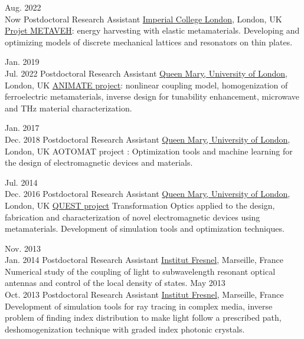 \documentclass{cv}
\begin{document}
\begin{entrylist}


	\entry
	{Aug. 2022 \\Now}
	{Postdoctoral Research Assistant}
	{\href{http://imperial.ac.uk/}{Imperial College London}, London, UK}
	{\href{https://www.metaveh.com/}{Projet METAVEH}: energy harvesting with elastic metamaterials. Developing and optimizing models of discrete mechanical lattices and resonators on thin plates.
	}


	\entry
	{Jan. 2019 \\Jul. 2022}
	{Postdoctoral Research Assistant}
	{\href{http://antennas.eecs.qmul.ac.uk/}{Queen Mary, University of London}, London, UK}
	{\href{https://animate-research.com/}{ANIMATE project}: nonlinear coupling model, homogenization of ferroelectric metamaterials, inverse design for tunability enhancement, microwave and THz material characterization.
	}


	\entry
	{Jan. 2017 \\Dec. 2018}
	{Postdoctoral Research Assistant}
	{\href{http://antennas.eecs.qmul.ac.uk/}{Queen Mary, University of London}, London, UK}
	{AOTOMAT project : Optimization tools and machine learning for the design of electromagnetic
		devices and materials.
	}

	\entry
	{Jul. 2014 \\Dec. 2016}
	{Postdoctoral Research Assistant}
	{\href{http://antennas.eecs.qmul.ac.uk/}{Queen Mary, University of London}, London, UK}
	{\href{http://www.quest-spatial-transformation.org/}{QUEST project}
		Transformation Optics applied to the design, fabrication and characterization of novel electromagnetic devices using metamaterials.
		Development of simulation tools and optimization techniques.
	}


	\entry
	{Nov. 2013\\ Jan. 2014}
	{Postdoctoral Research Assistant}
	{\href{http://www.fresnel.fr/}{Institut Fresnel}, Marseille, France}
	{
		Numerical study of the coupling of light
		to subwavelength resonant optical antennas and control of the local density of states.
	}
	\entry
	{May 2013 \\Oct. 2013}
	{Postdoctoral Research Assistant}
	{\href{http://www.fresnel.fr/}{Institut Fresnel}, Marseille, France}
	{
		Development of simulation tools for ray tracing in complex media, inverse problem of
		finding index distribution to make light follow a prescribed path, deshomogenization
		technique with graded index photonic crystals.
	}


\end{entrylist}
\end{document}
